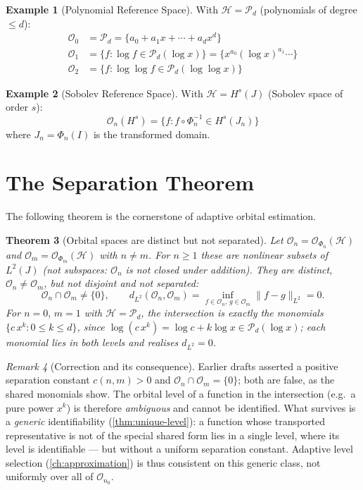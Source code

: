 \documentclass[11pt,twoside,openright]{book}
\theoremstyle{plain}
\newtheorem{theorem}{Theorem}[chapter]
\theoremstyle{definition}
\newtheorem{example}[theorem]{Example}
\theoremstyle{remark}
\newtheorem{remark}[theorem]{Remark}
\newcommand{\calH}{\mathcal{H}}
\newcommand{\calO}{\mathcal{O}}
\newcommand{\calP}{\mathcal{P}}
\newcommand{\norm}[1]{\|#1\|}
\begin{document}
\begin{example}[Polynomial Reference Space]
With $\calH = \calP_d$ (polynomials of degree $\leq d$):
\begin{align*}
\calO_0 &= \calP_d = \{a_0 + a_1 x + \cdots + a_d x^d\}\\
\calO_1 &= \{f : \log f \in \calP_d(\log x)\} = \{x^{a_0} (\log x)^{a_1} \cdots\}\\
\calO_2 &= \{f : \log\log f \in \calP_d(\log\log x)\}
\end{align*}
\end{example}

\begin{example}[Sobolev Reference Space]
With $\calH = H^s(J)$ (Sobolev space of order $s$):
\[
\calO_n(H^s) = \{f : f \circ \Phi_n^{-1} \in H^s(J_n)\}
\]
where $J_n = \Phi_n(I)$ is the transformed domain.
\end{example}

\section{The Separation Theorem}

The following theorem is the cornerstone of adaptive orbital estimation.

\begin{theorem}[Orbital spaces are distinct but not separated]
\label{thm:separation}
Let $\calO_n = \calO_{\Phi_n}(\calH)$ and $\calO_m = \calO_{\Phi_m}(\calH)$ with $n \neq m$. For $n\ge1$ these are \emph{nonlinear} subsets of $L^2(J)$ (not subspaces: $\calO_n$ is not closed under addition). They are distinct, $\calO_n\neq\calO_m$, but \emph{not} disjoint and \emph{not} separated:
\begin{equation}
\calO_n\cap\calO_m\neq\{0\},\qquad d_{L^2}(\calO_n,\calO_m)=\inf_{f\in\calO_n,\,g\in\calO_m}\norm{f-g}_{L^2}=0.
\label{eq:separation}
\end{equation}
For $n=0,\,m=1$ with $\calH=\calP_d$, the intersection is exactly the monomials $\{c\,x^k:0\le k\le d\}$, since $\log(c\,x^k)=\log c+k\log x\in\calP_d(\log x)$; each monomial lies in both levels and realises $d_{L^2}=0$.
\end{theorem}

\begin{remark}[Correction and its consequence]
Earlier drafts asserted a positive separation constant $c(n,m)>0$ and $\calO_n\cap\calO_m=\{0\}$; both are false, as the shared monomials show. The orbital level of a function in the intersection (e.g.\ a pure power $x^k$) is therefore \emph{ambiguous} and cannot be identified. What survives is a \emph{generic} identifiability (\cref{thm:unique-level}): a function whose transported representative is not of the special shared form lies in a single level, where its level is identifiable --- but without a uniform separation constant. Adaptive level selection (\cref{ch:approximation}) is thus consistent on this generic class, not uniformly over all of $\calO_{n_0}$.
\end{remark}
\end{document}
